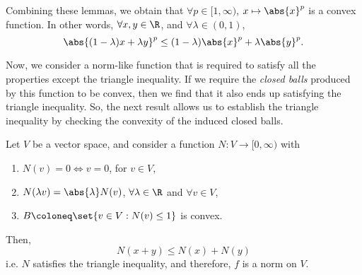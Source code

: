\documentclass[draft]{penrose}
\begin{document}
Combining these lemmas, we obtain that $\forall p \in [1,\infty)$, $x \mapsto \abs{x}^{p}$ is a convex function. In other words, $\forall x,y \in \R$, and $\forall \lambda \in (0,1)$,
\begin{equation*}
  \abs{(1-\lambda) x + \lambda y}^{p} \leq (1-\lambda) \abs{x}^{p} + \lambda \abs{y}^{p}.
\end{equation*}

Now, we consider a norm-like function that is required to satisfy all the properties except the triangle inequality. If we require the \emph{closed balls} produced by this function to be convex, then we find that it also ends up satisfying the triangle inequality. So, the next result allows us to establish the triangle inequality by checking the convexity of the induced closed balls.

\begin{nthm}
\label{thm:norm-convex-triangle}
  Let $V$ be a vector space, and consider a function $N : V \to [0,\infty)$ with
  \begin{enumerate}
  \item $N(v) = 0 \iff v =0$, for $v \in V$,
  \item $N(\lambda v) = \abs{\lambda}N(v)$, $\forall \lambda \in \R$ and $\forall v \in V$,
  \item $B \coloneq \set{v \in V : N(v) \leq 1}$ is convex.
  \end{enumerate}
  Then,
  \begin{equation*}
    N(x+y) \leq N(x) + N(y)
  \end{equation*}
  i.e. $N$ satisfies the triangle inequality, and therefore, $f$ is a norm on $V$.
\end{nthm}
\end{document}

